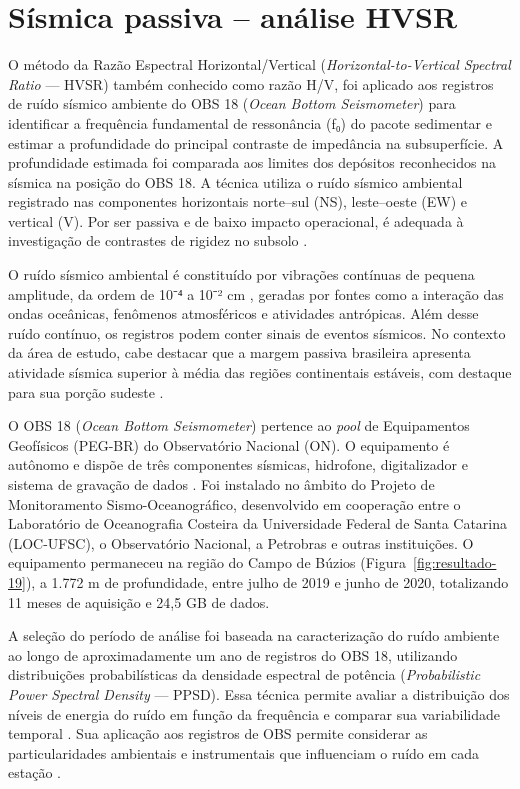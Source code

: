 \section{Sísmica passiva -- análise HVSR}\label{sec:4-6}

O método da Razão Espectral Horizontal/Vertical (\textit{Horizontal-to-Vertical Spectral Ratio} — HVSR) também conhecido como razão H/V, foi aplicado aos registros de ruído sísmico ambiente do OBS 18 (\textit{Ocean Bottom Seismometer}) para identificar a frequência fundamental de ressonância (f₀) do pacote sedimentar e estimar a profundidade do principal contraste de impedância na subsuperfície. A profundidade estimada foi comparada aos limites dos depósitos reconhecidos na sísmica na posição do OBS 18. A técnica utiliza o ruído sísmico ambiental registrado nas componentes horizontais norte--sul (NS), leste--oeste (EW) e vertical (V). Por ser passiva e de baixo impacto operacional, é adequada à investigação de contrastes de rigidez no subsolo \cite{nakamura1989,krylov2020}.

O ruído sísmico ambiental é constituído por vibrações contínuas de pequena amplitude, da ordem de 10⁻⁴ a 10⁻² cm \cite{okada2003}, geradas por fontes como a interação das ondas oceânicas, fenômenos atmosféricos e atividades antrópicas. Além desse ruído contínuo, os registros podem conter sinais de eventos sísmicos. No contexto da área de estudo, cabe destacar que a margem passiva brasileira apresenta atividade sísmica superior à média das regiões continentais estáveis, com destaque para sua porção sudeste \cite{assumpcao2014}.

O OBS 18 (\textit{Ocean Bottom Seismometer}) pertence ao \textit{pool} de Equipamentos Geofísicos (PEG-BR) do Observatório Nacional (ON). O equipamento é autônomo e dispõe de três componentes sísmicas, hidrofone, digitalizador e sistema de gravação de dados \cite{guralp}. Foi instalado no âmbito do Projeto de Monitoramento Sismo-Oceanográfico, desenvolvido em cooperação entre o Laboratório de Oceanografia Costeira da Universidade Federal de Santa Catarina (LOC-UFSC), o Observatório Nacional, a Petrobras e outras instituições. O equipamento permaneceu na região do Campo de Búzios (Figura~\ref{fig:resultado-19}), a 1.772 m de profundidade, entre julho de 2019 e junho de 2020, totalizando 11 meses de aquisição e 24,5 GB de dados.

A seleção do período de análise foi baseada na caracterização do ruído ambiente ao longo de aproximadamente um ano de registros do OBS 18, utilizando distribuições probabilísticas da densidade espectral de potência (\textit{Probabilistic Power Spectral Density} — PPSD). Essa técnica permite avaliar a distribuição dos níveis de energia do ruído em função da frequência e comparar sua variabilidade temporal \cite{mcnamara2004}. Sua aplicação aos registros de OBS permite considerar as particularidades ambientais e instrumentais que influenciam o ruído em cada estação \cite{webb1998,janiszewski2023}.

